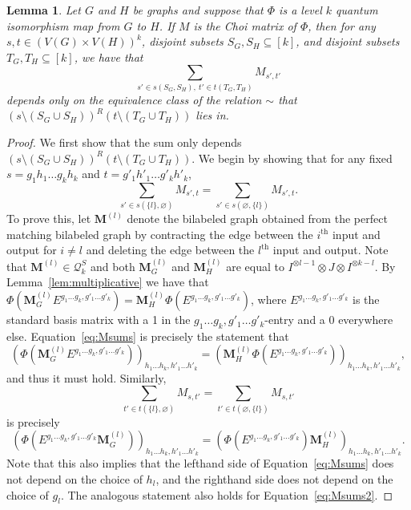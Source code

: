 \documentclass[a4paper,onecolumn,11pt,accepted=2026-01-06]{quantumarticle}
\theoremstyle{plain}
\newtheorem{lem}[thm]{Lemma}
\theoremstyle{remark}
\theoremstyle{definition}
\begin{document}
\begin{lem}\label{lem:Msums}
    Let $G$ and $H$ be graphs and suppose that $\Phi$ is a level $k$ quantum isomorphism map from $G$ to $H$. If $M$ is the Choi matrix of $\Phi$, then for any $s,t \in (V(G) \times V(H))^k$, disjoint subsets $S_G,S_H \subseteq [k]$, and disjoint subsets $T_G,T_H \subseteq [k]$, we have that
    \begin{equation}\label{eq:Msumlem}
        \sum_{s' \in s(S_G,S_H), \ t' \in t(T_G,T_H)} M_{s',t'}
    \end{equation}
    depends only on the equivalence class of the relation $\sim$ that $(s\setminus (S_G \cup S_H))^R(t\setminus (T_G \cup T_H))$ lies in.
\end{lem}
\begin{proof}
    We first show that the sum only depends $(s\setminus (S_G \cup S_H))^R(t\setminus (T_G \cup T_H))$. We begin by showing that for any fixed $s = g_1h_1\ldots g_kh_k$ and $t = g'_1h'_1\ldots g'_kh'_k$,
    \begin{equation}\label{eq:Msums}
        \sum_{s' \in s(\{l\}, \varnothing)} M_{s',t} = \sum_{s' \in s(\varnothing,\{l\})} M_{s',t}.
    \end{equation}
    To prove this, let $\boldsymbol{M}^{(l)}$ denote the bilabeled graph obtained from the perfect matching bilabeled graph by contracting the edge between the $i^\text{th}$ input and output for $i \ne l$ and deleting the edge between the $l^\text{th}$ input and output. Note that $\boldsymbol{M}^{(l)} \in \mathcal{Q}_k^S$ and both $\boldsymbol{M}^{(l)}_G$ and $\boldsymbol{M}^{(l)}_H$ are equal to $I^{\otimes l-1} \otimes J \otimes I^{\otimes k-l}$. By Lemma~\ref{lem:multiplicative} we have that $\Phi(\boldsymbol{M}^{(l)}_G E^{g_1\ldots g_k, g'_{1}\ldots g'_{k}}) = \boldsymbol{M}^{(l)}_H\Phi(E^{g_1\ldots g_k, g'_{1}\ldots g'_{k}})$, where $E^{g_1\ldots g_k, g'_{1}\ldots g'_{k}}$ is the standard basis matrix with a 1 in the $g_1\ldots g_k, g'_{1}\ldots g'_{k}$-entry and a 0 everywhere else. Equation~\eqref{eq:Msums} is precisely the statement that
\[\left(\Phi(\boldsymbol{M}^{(l)}_GE^{g_1\ldots g_k, g'_{1}\ldots g'_{k}})\right)_{h_1 \ldots h_k,h'_1 \ldots h'_{k}} = \left(\boldsymbol{M}^{(l)}_H\Phi(E^{g_1\ldots g_k, g'_{1}\ldots g'_{k}})\right)_{h_1 \ldots h_k,h'_1 \ldots h'_{k}},\]
and thus it must hold. Similarly,
\begin{equation}\label{eq:Msums2}
    \sum_{t' \in t(\{l\}, \varnothing)} M_{s,t'} = \sum_{t' \in t(\varnothing,\{l\})} M_{s,t'}
\end{equation}
is precisely 
\[\left(\Phi(E^{g_1\ldots g_k, g'_{1}\ldots g'_{k}}\boldsymbol{M}^{(l)}_G)\right)_{h_1 \ldots h_k,h'_1 \ldots h'_{k}} = \left(\Phi(E^{g_1\ldots g_k, g'_{1}\ldots g'_{k}})\boldsymbol{M}^{(l)}_H\right)_{h_1 \ldots h_k,h'_1 \ldots h'_{k}}.\]
Note that this also implies that the lefthand side of Equation~\eqref{eq:Msums} does not depend on the choice of $h_l$, and the righthand side does not depend on the choice of $g_l$. The analogous statement also holds for Equation~\eqref{eq:Msums2}.


\end{proof}
\end{document}
